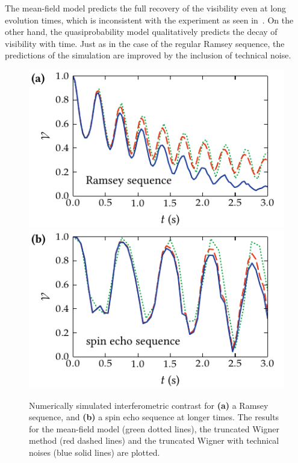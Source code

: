 The mean-field model predicts the full recovery of the visibility even at long evolution times, which is inconsistent with the experiment as seen in~.
On the other hand, the quasiprobability model qualitatively predicts the decay of visibility with time.
Just as in the case of the regular Ramsey sequence, the predictions of the simulation are improved by the inclusion of technical noise.

\begin{figure}
    \centerline{%
    \includegraphics{figures_generated/bec_noise/ramsey_visibility_long.pdf}%
    \includegraphics{figures_generated/bec_noise/echo_visibility_long.pdf}}

    \caption[Experimental and numerically simulated interferometric constrast in Ramsey and spin echo sequences for longer times]{
    Numerically simulated interferometric contrast for \textbf{(a)} a Ramsey sequence, and \textbf{(b)} a spin echo sequence at longer times.
    The results for the mean-field model (green dotted lines), the truncated Wigner method (red dashed lines) and the truncated Wigner with technical noises (blue solid lines) are plotted.}%

    \label{fig:bec-noise:visibility:visibility-long}
\end{figure}

